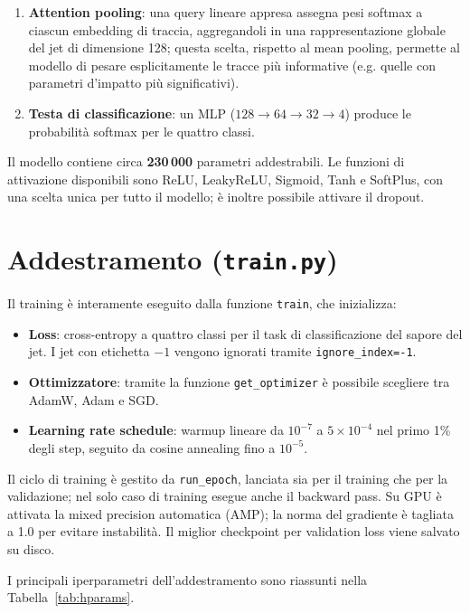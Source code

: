 \documentclass[11pt,a4paper]{article}
\begin{document}
\begin{enumerate}[topsep=1pt, itemsep=0pt, parsep=1pt]
    \item \textbf{Attention pooling}: una query lineare appresa assegna pesi softmax a ciascun embedding di traccia, aggregandoli in una rappresentazione globale del jet di dimensione 128; questa scelta, rispetto al mean pooling, permette al modello di pesare esplicitamente le tracce più informative (e.g. quelle con parametri d'impatto più significativi).
    
    \item \textbf{Testa di classificazione}: un MLP ($128 \to 64 \to 32 \to 4$) produce le probabilità softmax per le quattro classi.
\end{enumerate}

Il modello contiene circa \textbf{230\,000} parametri addestrabili.
Le funzioni di attivazione disponibili sono ReLU, LeakyReLU, Sigmoid, Tanh e SoftPlus, con una scelta unica per tutto il modello; è inoltre possibile attivare il dropout.


\section{Addestramento (\texttt{train.py})}

Il training è interamente eseguito dalla funzione \texttt{train}, che inizializza:
\begin{itemize}[topsep=1pt, itemsep=0pt, parsep=1pt]
    \item \textbf{Loss}: cross-entropy a quattro classi per il task di classificazione del sapore del jet.
        I jet con etichetta $-1$ vengono ignorati tramite \texttt{ignore\_index=-1}.

    \item \textbf{Ottimizzatore}: tramite la funzione \texttt{get\_optimizer} è possibile scegliere tra AdamW, Adam e SGD.

    \item \textbf{Learning rate schedule}: warmup lineare da $10^{-7}$ a $5 \times 10^{-4}$ nel primo 1\% degli step, seguito da cosine annealing fino a $10^{-5}$.
\end{itemize}

Il ciclo di training è gestito da \texttt{run\_epoch}, lanciata sia per il training che per la validazione; nel solo caso di training esegue anche il backward pass.
Su GPU è attivata la mixed precision automatica (AMP); la norma del gradiente è tagliata a 1.0 per evitare instabilità.
Il miglior checkpoint per validation loss viene salvato su disco.

I principali iperparametri dell'addestramento sono riassunti nella Tabella~\ref{tab:hparams}.
\end{document}
